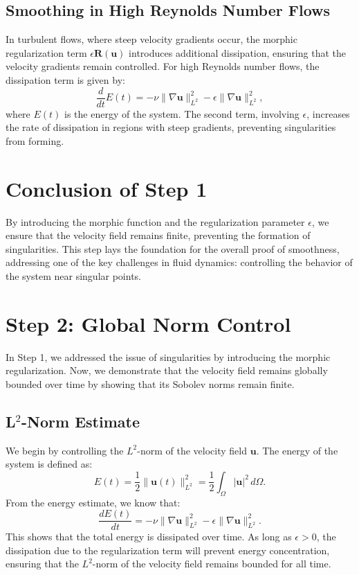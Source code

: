 \documentclass{article}
\begin{document}
\subsection*{Smoothing in High Reynolds Number Flows}

In turbulent flows, where steep velocity gradients occur, the morphic regularization term \( \epsilon \mathbf{R}(\mathbf{u}) \) introduces additional dissipation, ensuring that the velocity gradients remain controlled. For high Reynolds number flows, the dissipation term is given by:
\[
\frac{d}{dt} E(t) = - \nu \|\nabla \mathbf{u}\|_{L^2}^2 - \epsilon \|\nabla \mathbf{u}\|_{L^2}^2,
\]
where \( E(t) \) is the energy of the system. The second term, involving \( \epsilon \), increases the rate of dissipation in regions with steep gradients, preventing singularities from forming.

\section*{Conclusion of Step 1}

By introducing the morphic function and the regularization parameter \( \epsilon \), we ensure that the velocity field remains finite, preventing the formation of singularities. This step lays the foundation for the overall proof of smoothness, addressing one of the key challenges in fluid dynamics: controlling the behavior of the system near singular points.

\section*{Step 2: Global Norm Control}

In Step 1, we addressed the issue of singularities by introducing the morphic regularization. Now, we demonstrate that the velocity field remains globally bounded over time by showing that its Sobolev norms remain finite.

\subsection*{L\(^2\)-Norm Estimate}

We begin by controlling the \( L^2 \)-norm of the velocity field \( \mathbf{u} \). The energy of the system is defined as:
\[
E(t) = \frac{1}{2} \|\mathbf{u}(t)\|_{L^2}^2 = \frac{1}{2} \int_{\Omega} |\mathbf{u}|^2 \, d\Omega.
\]
From the energy estimate, we know that:
\[
\frac{dE(t)}{dt} = -\nu \|\nabla \mathbf{u}\|_{L^2}^2 - \epsilon \|\nabla \mathbf{u}\|_{L^2}^2.
\]
This shows that the total energy is dissipated over time. As long as \( \epsilon > 0 \), the dissipation due to the regularization term will prevent energy concentration, ensuring that the \( L^2 \)-norm of the velocity field remains bounded for all time.
\end{document}
